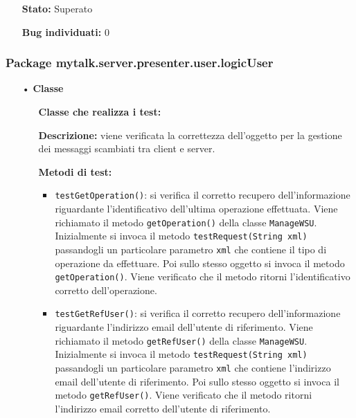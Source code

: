 {\begin{sloppypar}
{\begin{itemize}
\begin{itemize}
\begin{itemize}
						\item \texttt{testOnTextMessage()}: si verifica la corretta ricezione di un messaggio testuale da parte del client. Viene invocato il metodo \texttt{onTextMessage(CharBuffer buffer)} della classe \texttt{WSAdmin} senza specificare il riferimento al client a cui spedire il messaggio. Viene verificato che il metodo crei il messaggio corretto.
					\end{itemize}
					\item[] \textbf{Stato:} Superato

					\item[] \textbf{Bug individuati:} 0
				\end{itemize}	
			\end{itemize}
		}
		
		\subsubsection{Package mytalk.server.presenter.user.logicUser} {
			\begin{itemize}
				\item[•]\textbf{Classe } 
				\begin{itemize}
					\item[] \textbf{Classe che realizza i test:} \\ 

					\item[] \textbf{Descrizione:} viene verificata la correttezza dell'oggetto per la gestione dei messaggi scambiati tra client e server.

					\item[] \textbf{Metodi di test:}
					\begin{itemize}
						\item \texttt{testGetOperation()}: si verifica il corretto recupero dell'informazione riguardante l'identificativo dell'ultima operazione effettuata. Viene richiamato il metodo \texttt{getOperation()} della classe \texttt{ManageWSU}. Inizialmente si invoca il metodo \texttt{testRequest(String xml)} passandogli un particolare parametro \texttt{xml} che contiene il tipo di operazione da effettuare. Poi sullo stesso oggetto si invoca il metodo \texttt{getOperation()}. Viene verificato che il metodo ritorni l'identificativo corretto dell'operazione.
						
						\item \texttt{testGetRefUser()}: si verifica il corretto recupero dell'informazione riguardante l'indirizzo email dell'utente di riferimento. Viene richiamato il metodo \texttt{getRefUser()} della classe \texttt{ManageWSU}. Inizialmente si invoca il metodo \texttt{testRequest(String xml)} passandogli un particolare parametro \texttt{xml} che contiene l'indirizzo email dell'utente di riferimento. Poi sullo stesso oggetto si invoca il metodo \texttt{getRefUser()}. Viene verificato che il metodo ritorni l'indirizzo email corretto dell'utente di riferimento.
						

\end{itemize}
\end{itemize}
\end{itemize}}
\end{sloppypar}}
